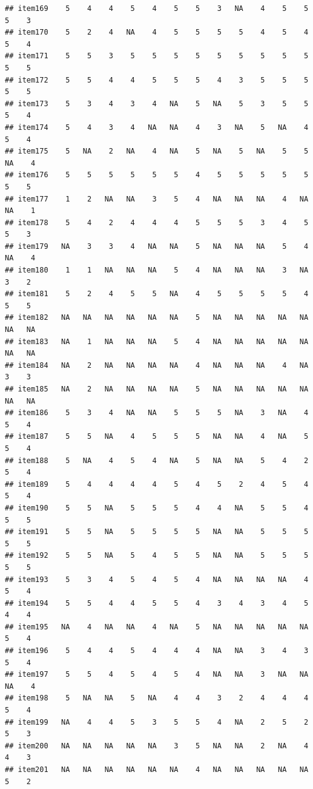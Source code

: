 \documentclass[
  man]{apa6}
\begin{document}
\begin{verbatim}
## item169    5    4    4    5    4    5    5    3   NA    4    5    5    5    3
## item170    5    2    4   NA    4    5    5    5    5    4    5    4    5    4
## item171    5    5    3    5    5    5    5    5    5    5    5    5    5    5
## item172    5    5    4    4    5    5    5    4    3    5    5    5    5    5
## item173    5    3    4    3    4   NA    5   NA    5    3    5    5    5    4
## item174    5    4    3    4   NA   NA    4    3   NA    5   NA    4    5    4
## item175    5   NA    2   NA    4   NA    5   NA    5   NA    5    5   NA    4
## item176    5    5    5    5    5    5    4    5    5    5    5    5    5    5
## item177    1    2   NA   NA    3    5    4   NA   NA   NA    4   NA   NA    1
## item178    5    4    2    4    4    4    5    5    5    3    4    5    5    3
## item179   NA    3    3    4   NA   NA    5   NA   NA   NA    5    4   NA    4
## item180    1    1   NA   NA   NA    5    4   NA   NA   NA    3   NA    3    2
## item181    5    2    4    5    5   NA    4    5    5    5    5    4    5    5
## item182   NA   NA   NA   NA   NA   NA    5   NA   NA   NA   NA   NA   NA   NA
## item183   NA    1   NA   NA   NA    5    4   NA   NA   NA   NA   NA   NA   NA
## item184   NA    2   NA   NA   NA   NA    4   NA   NA   NA    4   NA    3    3
## item185   NA    2   NA   NA   NA   NA    5   NA   NA   NA   NA   NA   NA   NA
## item186    5    3    4   NA   NA    5    5    5   NA    3   NA    4    5    4
## item187    5    5   NA    4    5    5    5   NA   NA    4   NA    5    5    4
## item188    5   NA    4    5    4   NA    5   NA   NA    5    4    2    5    4
## item189    5    4    4    4    4    5    4    5    2    4    5    4    5    4
## item190    5    5   NA    5    5    5    4    4   NA    5    5    4    5    5
## item191    5    5   NA    5    5    5    5   NA   NA    5    5    5    5    5
## item192    5    5   NA    5    4    5    5   NA   NA    5    5    5    5    5
## item193    5    3    4    5    4    5    4   NA   NA   NA   NA    4    5    4
## item194    5    5    4    4    5    5    4    3    4    3    4    5    4    4
## item195   NA    4   NA   NA    4   NA    5   NA   NA   NA   NA   NA    5    4
## item196    5    4    4    5    4    4    4   NA   NA    3    4    3    5    4
## item197    5    5    4    5    4    5    4   NA   NA    3   NA   NA   NA    4
## item198    5   NA   NA    5   NA    4    4    3    2    4    4    4    5    4
## item199   NA    4    4    5    3    5    5    4   NA    2    5    2    5    3
## item200   NA   NA   NA   NA   NA    3    5   NA   NA    2   NA    4    4    3
## item201   NA   NA   NA   NA   NA   NA    4   NA   NA   NA   NA   NA    5    2

\end{verbatim}
\end{document}

